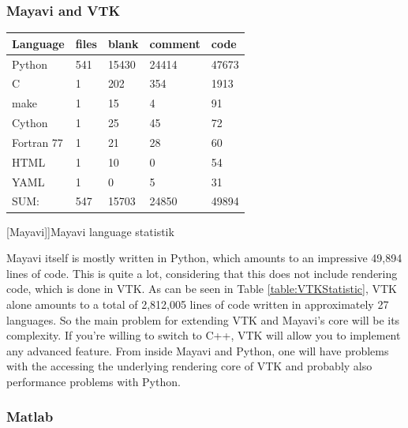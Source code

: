 \subsubsection{Mayavi and VTK}
\begin{table}[htbp]
    \centering
    \begin{tabular}{l|l|l|l|l}
        \hline
        \textbf{Language} &    \textbf{files} &    \textbf{blank} &  \textbf{comment} &  \textbf{code}\\
        \hline
        Python          &               541      &    15430     &    24414   &       47673\\
        C               &                 1      &     202      &      354   &      1913\\
        make            &                 1      &       15     &         4  &        91\\
        Cython          &                 1      &       25     &        45  &        72\\
        Fortran 77      &                 1      &       21     &        28  &        60\\
        HTML            &                 1      &       10     &         0  &        54\\
        YAML            &                 1      &        0     &        5   &       31\\
        \hline
        SUM:            &               547       &   15703     &     24850  &       49894\\
        \hline
        \end{tabular}
    [Mayavi]]{Mayavi language statistik}
    \label{table:mayavistatistic}
\end{table}

Mayavi itself is mostly written in Python, which amounts to an impressive 49,894 lines of code. This is quite a lot, considering that this does not include rendering code, which is done in VTK.
As can be seen in Table \ref{table:VTKStatistic}, VTK alone amounts to a total of 2,812,005 lines of code written in approximately 27 languages. 
So the main problem for extending VTK and Mayavi's core will be its complexity. If you're willing to switch to C++, VTK will allow you to implement any advanced feature. From inside Mayavi and Python, one will have problems with the accessing the underlying rendering core of VTK and probably also performance problems with Python.


\subsubsection{Matlab}

